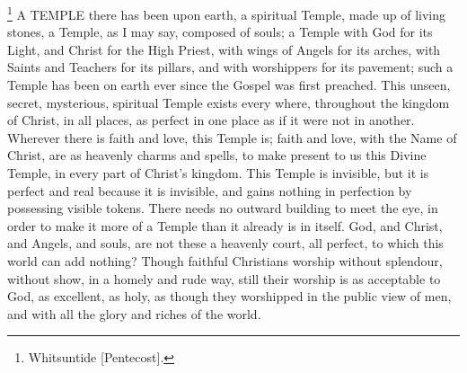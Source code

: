 \footnote{Whitsuntide [Pentecost].} A TEMPLE there has
been upon earth, a spiritual Temple, made up of living stones, a
Temple, as I may say, composed of souls; a Temple with God for its
Light, and Christ for the High Priest, with wings of Angels for its
arches, with Saints and Teachers for its pillars, and with worshippers
for its pavement; such a Temple has been on earth ever since the
Gospel was first preached. This unseen, secret, mysterious, spiritual
Temple exists every where, throughout the kingdom of Christ, in all
places, as perfect in one place as if it were not in another. Wherever
there is faith and love, this Temple is; faith and love, with the Name
of Christ, are as heavenly charms and spells, to make present to us
this Divine Temple, in every part of Christ's kingdom. This Temple is
invisible, but it is perfect and real because it is invisible, and
gains nothing in perfection by possessing visible tokens. There needs
no outward building to meet the eye, in order to make it more of a
Temple than it already is in itself. God, and Christ, and Angels, and
souls, are not these a heavenly court, all perfect, to which this
world can add nothing? Though faithful Christians worship without
splendour, without show, in a homely and rude way, still their worship
is as acceptable to God, as excellent, as holy, as though they
worshipped in the public view of men, and with all the glory and
riches of the world.

